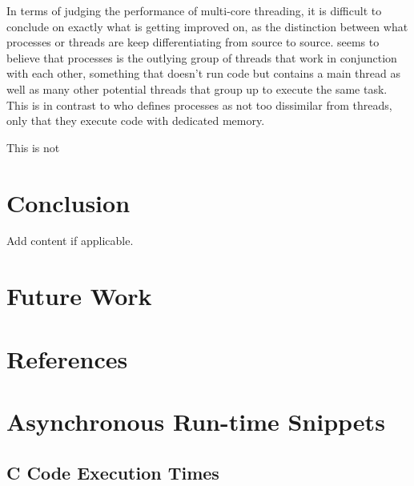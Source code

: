 \documentclass[12pt,a4paper]{article}
\begin{document}
In terms of judging the performance of multi-core threading, it is difficult to conclude on exactly what is getting improved on, as the distinction between what processes or threads are keep differentiating from source to source. \citeauthor{White2020} seems to believe that processes is the outlying group of threads that work in conjunction with each other, something that doesn't run code but contains a main thread as well as many other potential threads that group up to execute the same task. This is in contrast to \citeauthor{Rauber2023} who defines processes as not too dissimilar from threads, only that they execute code with dedicated memory.

This is not 

\section{Conclusion}

Add content if applicable.

\section{Future Work}



\clearpage
\section{References}
\printbibliography

\clearpage
\appendix

\section{Asynchronous Run-time Snippets}

\subsection{C Code Execution Times} 
\end{document}
